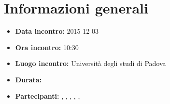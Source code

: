 \newpage
\section{Informazioni generali}
\begin{itemize}
\item \textbf{Data incontro:} 2015-12-03
\item \textbf{Ora incontro:} 10:30
\item \textbf{Luogo incontro:} Università degli studi di Padova
\item \textbf{Durata:} 
\item \textbf{Partecipanti:} \AF, \FB,  \GN,  \GR,  \MV, \MP 

\end{itemize}
